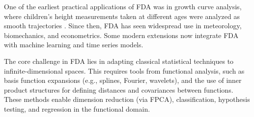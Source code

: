 \documentclass[
	12pt,				%
	oneside,			%
	a4paper,			%
	english,			%
	brazil				%
	]{abntex2ppgsi}
\newtheorem{definition}{Definition}
\begin{document}
One of the earliest practical applications of FDA was in growth curve analysis, where children’s height measurements taken at different ages were analyzed as smooth trajectories \cite{ramsay1991some}. Since then, FDA has seen widespread use in meteorology, biomechanics, and econometrics. Some modern extensions now integrate FDA with machine learning and time series models.

The core challenge in FDA lies in adapting classical statistical techniques to infinite-dimensional spaces. This requires tools from functional analysis, such as basis function expansions (e.g., splines, Fourier, wavelets), and the use of inner product structures for defining distances and covariances between functions. These methods enable dimension reduction (via FPCA), classification, hypothesis testing, and regression in the functional domain. %



\end{document}
